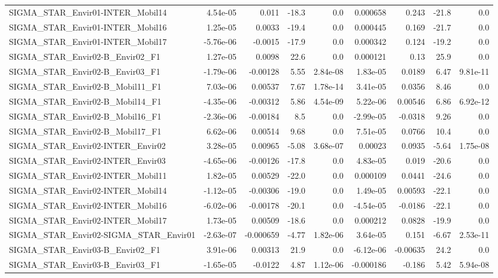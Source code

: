 \begin{tabular}{lrrrrrrrr}
SIGMA_STAR_Envir01-INTER_Mobil14 & 4.54e-05 & 0.011 & -18.3 & 0.0 & 0.000658 & 0.243 & -21.8 & 0.0 \\
SIGMA_STAR_Envir01-INTER_Mobil16 & 1.25e-05 & 0.0033 & -19.4 & 0.0 & 0.000445 & 0.169 & -21.7 & 0.0 \\
SIGMA_STAR_Envir01-INTER_Mobil17 & -5.76e-06 & -0.0015 & -17.9 & 0.0 & 0.000342 & 0.124 & -19.2 & 0.0 \\
SIGMA_STAR_Envir02-B_Envir02_F1 & 1.27e-05 & 0.0098 & 22.6 & 0.0 & 0.000121 & 0.13 & 25.9 & 0.0 \\
SIGMA_STAR_Envir02-B_Envir03_F1 & -1.79e-06 & -0.00128 & 5.55 & 2.84e-08 & 1.83e-05 & 0.0189 & 6.47 & 9.81e-11 \\
SIGMA_STAR_Envir02-B_Mobil11_F1 & 7.03e-06 & 0.00537 & 7.67 & 1.78e-14 & 3.41e-05 & 0.0356 & 8.46 & 0.0 \\
SIGMA_STAR_Envir02-B_Mobil14_F1 & -4.35e-06 & -0.00312 & 5.86 & 4.54e-09 & 5.22e-06 & 0.00546 & 6.86 & 6.92e-12 \\
SIGMA_STAR_Envir02-B_Mobil16_F1 & -2.36e-06 & -0.00184 & 8.5 & 0.0 & -2.99e-05 & -0.0318 & 9.26 & 0.0 \\
SIGMA_STAR_Envir02-B_Mobil17_F1 & 6.62e-06 & 0.00514 & 9.68 & 0.0 & 7.51e-05 & 0.0766 & 10.4 & 0.0 \\
SIGMA_STAR_Envir02-INTER_Envir02 & 3.28e-05 & 0.00965 & -5.08 & 3.68e-07 & 0.00023 & 0.0935 & -5.64 & 1.75e-08 \\
SIGMA_STAR_Envir02-INTER_Envir03 & -4.65e-06 & -0.00126 & -17.8 & 0.0 & 4.83e-05 & 0.019 & -20.6 & 0.0 \\
SIGMA_STAR_Envir02-INTER_Mobil11 & 1.82e-05 & 0.00529 & -22.0 & 0.0 & 0.000109 & 0.0441 & -24.6 & 0.0 \\
SIGMA_STAR_Envir02-INTER_Mobil14 & -1.12e-05 & -0.00306 & -19.0 & 0.0 & 1.49e-05 & 0.00593 & -22.1 & 0.0 \\
SIGMA_STAR_Envir02-INTER_Mobil16 & -6.02e-06 & -0.00178 & -20.1 & 0.0 & -4.54e-05 & -0.0186 & -22.1 & 0.0 \\
SIGMA_STAR_Envir02-INTER_Mobil17 & 1.73e-05 & 0.00509 & -18.6 & 0.0 & 0.000212 & 0.0828 & -19.9 & 0.0 \\
SIGMA_STAR_Envir02-SIGMA_STAR_Envir01 & -2.63e-07 & -0.000659 & -4.77 & 1.82e-06 & 3.64e-05 & 0.151 & -6.67 & 2.53e-11 \\
SIGMA_STAR_Envir03-B_Envir02_F1 & 3.91e-06 & 0.00313 & 21.9 & 0.0 & -6.12e-06 & -0.00635 & 24.2 & 0.0 \\
SIGMA_STAR_Envir03-B_Envir03_F1 & -1.65e-05 & -0.0122 & 4.87 & 1.12e-06 & -0.000186 & -0.186 & 5.42 & 5.94e-08 \\

\end{tabular}
